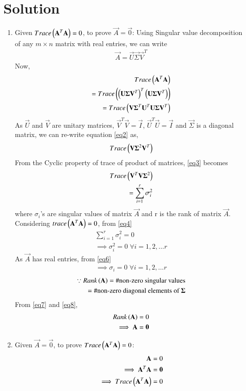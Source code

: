 \documentclass[journal,12pt,twocolumn]{IEEEtran}
\numberwithin{table}{section}
\begin{document}
\section{Solution}
\begin{enumerate}
\item Given $Trace\left(\mathbf{A}^T\mathbf{A}\right)=0$, to prove $\vec{A}=\vec{0}$:
Using Singular value decomposition of any $m\times n$ matrix with real entries, we can write
\begin{align}
\vec{A}=\vec{U}\vec{\Sigma}\vec{V}^T
\end{align}
Now,
\begin{align}
Trace\left(\mathbf{A}^T\mathbf{A}\right)\label{eq1}\\
=Trace\left(\left(\mathbf{U}\mathbf{\Sigma}\mathbf{V}^T\right)^T\left(\mathbf{U}\mathbf{\Sigma}\mathbf{V}^T\right)\right)\\
=Trace\left(\mathbf{V}\mathbf{\Sigma}^T\mathbf{U}^T\mathbf{U}\mathbf{\Sigma}\mathbf{V}^T\right)\label{eq2}
\end{align}
As $\vec{U}$ and $\vec{V}$ are unitary matrices, $\vec{V}^T\vec{V}=\vec{I}$, $\vec{U}^T\vec{U}=\vec{I}$ and $\vec{\Sigma}$ is a diagonal matrix, we can re-write equation \eqref{eq2} as,
\begin{align}
Trace\left(\mathbf{V}\mathbf{\Sigma}^2\mathbf{V}^T\right)\label{eq3}
\end{align}
From the Cyclic property of trace of product of matrices, \eqref{eq3} becomes
\begin{align}
Trace\left(\mathbf{V}^T\mathbf{V}\mathbf{\Sigma}^2\right)\\
=\sum\limits_{i=1}^r \sigma_{i}^2\label{eq4}
\end{align}
where $\sigma_{i}$'s are singular values of matrix $\vec{A}$ and r is the rank of matrix $\vec{A}$. Considering $trace\left(\mathbf{A}^T\mathbf{A}\right)=0$, from \eqref{eq4}
\begin{align}
\sum\limits_{i=1}^r \sigma_{i}^2=0\\
\implies \sigma_{i}^2=0 \; \forall i=1,2,\dots r \label{eq6}
\end{align}
As $\vec{A}$ has real entries, from \eqref{eq6}
\begin{align}
\implies \sigma_i=0 \; \forall i=1,2,\dots r \label{eq7}
\end{align}
\begin{align}
\because Rank\left(\mathbf{A}\right)=\# \text{non-zero singular values}\label{eq8}\\
=\# \text{non-zero diagonal elements of }\mathbf{\Sigma}
\end{align}
From \eqref{eq7} and \eqref{eq8},
\begin{align}
Rank\left(\mathbf{A}\right)=0\\
\implies \mathbf{A}=\mathbf{0}
\end{align}
\item Given $\vec{A}=\vec{0}$, to prove $Trace\left(\mathbf{A}^T\mathbf{A}\right)=0$:
\begin{align}
\mathbf{A}=0\\
\implies \mathbf{A}^T\mathbf{A}=\mathbf{0}\\
\implies Trace\left(\mathbf{A}^T\mathbf{A}\right)=0
\end{align}
\end{enumerate}
\end{document}
